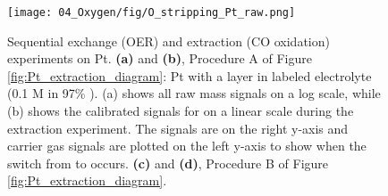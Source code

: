 \begin{figure}[t]
	\centering
	\texttt{[image: 04\_Oxygen/fig/O\_stripping\_Pt\_raw.png]}
	\caption{
		Sequential exchange (OER) and extraction (CO oxidation) experiments on Pt. \textbf{(a)} and \textbf{(b)}, Procedure A of Figure \ref{fig:Pt_extraction_diagram}: Pt with a  layer in labeled electrolyte (0.1 M  in 97\% ). (a) shows all raw mass signals on a log scale, while (b) shows the calibrated signals for  on a linear scale during the extraction experiment. The  signals are on the right y-axis and carrier gas signals are plotted on the left y-axis to show when the switch from  to  occurs.
		\textbf{(c)} and \textbf{(d)}, Procedure B of Figure \ref{fig:Pt_extraction_diagram}.
	}
	\label{fig:Pt_extraction_raw}
\end{figure}

